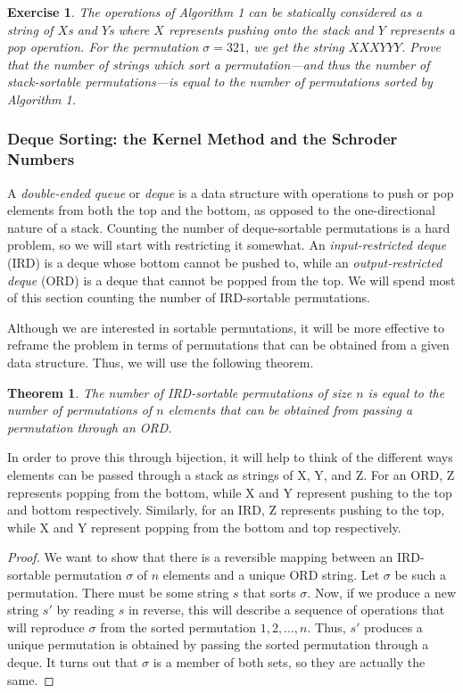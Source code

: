 \documentclass[12pt]{article}
\newtheorem{thm}{Theorem} %
\newtheorem{exc}{Exercise} %
\begin{document}
\begin{exc}
The operations of Algorithm 1 can be statically considered as a string of $X$s and $Y$s where $X$ represents pushing onto the stack and $Y$ represents a pop operation. For the permutation $\sigma=321$, we get the string $XXXYYY$. Prove that the number of strings which sort a permutation---and thus the number of stack-sortable permutations---is equal to the number of permutations sorted by Algorithm 1.
\end{exc} 

\subsubsection{Deque Sorting: the Kernel Method and the Schroder Numbers}
A \textit{double-ended queue} or \textit{deque} is a data structure with operations to push or pop elements from both the top and the bottom, as opposed to the one-directional nature of a stack. Counting the number of deque-sortable permutations is a hard problem, so we will start with restricting it somewhat. An \textit{input-restricted deque} (IRD) is a deque whose bottom cannot be pushed to, while an \textit{output-restricted deque} (ORD) is a deque that cannot be popped from the top. We will spend most of this section counting the number of IRD-sortable permutations.

Although we are interested in sortable permutations, it will be more effective to reframe the problem in terms of permutations that can be obtained from a given data structure. Thus, we will use the following theorem.

\begin{thm}
The number of IRD-sortable permutations of size $n$ is equal to the number of permutations of $n$ elements that can be obtained from passing a permutation through an ORD.
\end{thm}

In order to prove this through bijection, it will help to think of the different ways elements can be passed through a stack as strings of X, Y, and Z. For an ORD, Z represents popping from the bottom, while X and Y represent pushing to the top and bottom respectively. Similarly, for an IRD, Z represents pushing to the top, while X and Y represent popping from the bottom and top respectively. 

\begin{proof}
We want to show that there is a reversible mapping between an IRD-sortable permutation $\sigma$ of $n$ elements and a unique ORD string. Let $\sigma$ be such a permutation. There must be some string $s$ that sorts $\sigma$. Now, if we produce a new string $s'$ by reading $s$ in reverse, this will describe a sequence of operations that will reproduce $\sigma$ from the sorted permutation $1,2,\ldots,n$. Thus, $s'$ produces a unique permutation is obtained by passing the sorted permutation through a deque. It turns out that $\sigma$ is a member of both sets, so they are actually the same. 
\end{proof}
\end{document}
